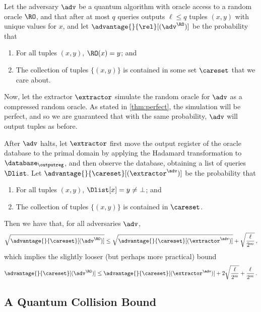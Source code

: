      \begin{lemma}\label{lemma:imperfect}
        Let the adversary $\adv$ be a quantum algorithm with oracle access to
        a random oracle $\RO$, and that after at most $q$ queries outputs $\ell
        \leq q$ tuples $(x,y)$ with unique values for $x$, and let
        $\advantage{}{\rel}[(\adv^{\RO})]$ be the probability that 
        \begin{enumerate}
          \item For all tuples $(x,y)$, $\RO(x) = y$; and
          \item The collection of tuples $\{(x,y)\}$ is contained in some set
            $\careset$ that we care about.
        \end{enumerate}
        Now, let the extractor $\extractor$ simulate the random oracle for
          $\adv$ as a compressed random oracle. As stated in
          \cref{thm:perfect}, the simulation will be perfect, and
          so we are guaranteed that with the same probability, $\adv$ will
          output tuples as before. 

        After $\adv$ halts, let $\extractor$ first move
          the output register of the oracle database to the
          primal domain by applying the Hadamard transformation to
          $\database_\outputreg$, and
          then observe the database, obtaining a list of queries $\Dlist$.
          Let $\advantage{}{\careset}[(\extractor^\adv)]$ be the probability that
        \begin{enumerate}
          \item For all tuples $(x,y)$, $\Dlist[x] = y \neq\ \perp$; and
          \item The collection of tuples $\{(x,y)\}$ is contained in $\careset$.
        \end{enumerate}

        \noindent
        Then we have that, for all adversaries $\adv$,
        \[
          \sqrt{\advantage{}{\careset}[(\adv^{\RO})]} \leq
          \sqrt{\advantage{}{\careset}[(\extractor^\adv)]} +
          \sqrt{\frac{\ell}{2^m}}\, ,
        \]
        which implies the slightly looser (but perhaps more practical) bound
        \[
          \advantage{}{\careset}[(\adv^{\RO})] \leq
          \advantage{}{\careset}[(\extractor^\adv)] +
          2\sqrt{\frac{\ell}{2^{m}}} + \frac{\ell}{2^m}\, .
        \]
      \end{lemma}

  \subsection{A Quantum Collision Bound}

